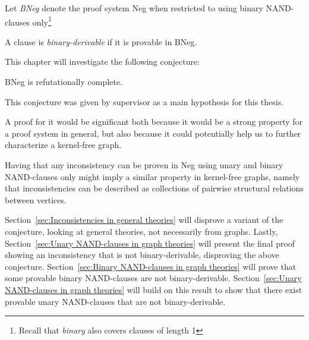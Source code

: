 

\begin{definition}
   Let \textit{BNeg} denote the proof system Neg when restricted to using binary NAND-clauses only\footnote{Recall that \textit{binary} also covers clauses of length 1}
\end{definition}
\begin{definition}
  A clause is \textit{binary-derivable} if it is provable in BNeg.
\end{definition}
This chapter will investigate the following conjecture:
\begin{conjecture}
  BNeg is refutationally complete.
  \label{thm:Neg2_ref_complete}
\end{conjecture}
This conjecture was given by supervisor as a main hypothesis for this thesis.

A proof for it would be significant both because it would be a strong property for a proof system in general, but also because it could potentially help us to further characterize a kernel-free graph.

Having that any inconsistency can be proven in Neg using unary and binary NAND-clauses only might imply a similar property in kernel-free graphs, namely that inconsistencies can be described as collections of pairwise structural relations between vertices.

Section~\ref{sec:Inconsistencies in general theories} will disprove a variant of the conjecture, looking at general theories, not necessarily from graphs.
Lastly, Section~\ref{sec:Unary NAND-clauses in graph theories} will present the final proof showing an inconsistency that is not binary-derivable, disproving the above conjecture. 
Section~\ref{sec:Binary NAND-clauses in graph theories} will prove that some provable binary NAND-clauses are not binary-derivable.
Section~\ref{sec:Unary NAND-clauses in graph theories} will build on this result to show that there exist provable unary NAND-clauses that are not binary-derivable.
